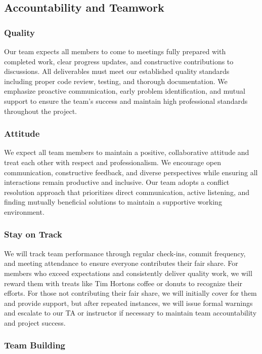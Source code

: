 \documentclass{article}
\begin{document}
\subsection*{Accountability and Teamwork}

\subsubsection*{Quality} 

Our team expects all members to come to meetings fully prepared with completed work, 
clear progress updates, and constructive contributions to discussions.
All deliverables must meet our established quality standards including proper code review, testing, and thorough documentation. 
We emphasize proactive communication, early problem identification, and mutual support to ensure the team's success and maintain high 
professional standards throughout the project.

\subsubsection*{Attitude}

We expect all team members to maintain a positive, collaborative attitude and treat each other with respect and professionalism. 
We encourage open communication, constructive feedback, and diverse perspectives while ensuring all interactions remain productive and inclusive. 
Our team adopts a conflict resolution approach that prioritizes direct communication, active listening, and finding mutually beneficial solutions to 
maintain a supportive working environment.

\subsubsection*{Stay on Track}

We will track team performance through regular check-ins, commit frequency, and meeting attendance to ensure everyone contributes their fair share. 
For members who exceed expectations and consistently deliver quality work, we will reward them with treats like Tim Hortons coffee or donuts to recognize their efforts. 
For those not contributing their fair share, we will initially cover for them and provide support, but after repeated instances, we will issue formal warnings and escalate 
to our TA or instructor if necessary to maintain team accountability and project success.

\subsubsection*{Team Building}
\end{document}
